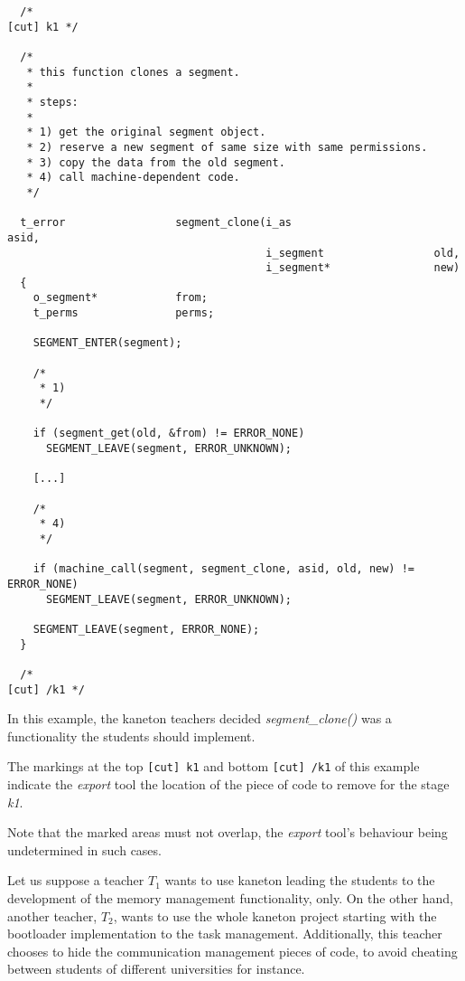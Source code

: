 \begin{verbatim}
  /*                                                                [cut] k1 */

  /*
   * this function clones a segment.
   *
   * steps:
   *
   * 1) get the original segment object.
   * 2) reserve a new segment of same size with same permissions.
   * 3) copy the data from the old segment.
   * 4) call machine-dependent code.
   */

  t_error                 segment_clone(i_as                      asid,
                                        i_segment                 old,
                                        i_segment*                new)
  {
    o_segment*            from;
    t_perms               perms;

    SEGMENT_ENTER(segment);

    /*
     * 1)
     */

    if (segment_get(old, &from) != ERROR_NONE)
      SEGMENT_LEAVE(segment, ERROR_UNKNOWN);

    [...]

    /*
     * 4)
     */

    if (machine_call(segment, segment_clone, asid, old, new) != ERROR_NONE)
      SEGMENT_LEAVE(segment, ERROR_UNKNOWN);

    SEGMENT_LEAVE(segment, ERROR_NONE);
  }

  /*                                                               [cut] /k1 */
\end{verbatim}

In this example, the kaneton teachers decided \textit{segment\_clone()}
was a functionality the students should implement.

The markings at the top \verb|[cut] k1| and bottom \verb|[cut] /k1| of this
example indicate the \textit{export} tool the location of the piece of code
to remove for the stage \textit{k1}.

Note that the marked areas must not overlap, the \textit{export} tool's
behaviour being undetermined in such cases.

Let us suppose a teacher $T_{1}$ wants to use kaneton leading the students to
the development of the memory management functionality, only. On the other
hand, another teacher, $T_{2}$, wants to use the whole kaneton project starting
with the bootloader implementation to the task management. Additionally,
this teacher chooses to hide the communication management pieces of code,
to avoid cheating between students of different universities for instance.

